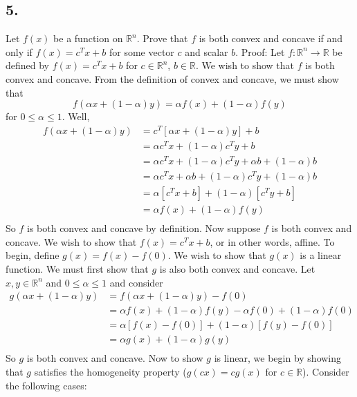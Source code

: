 \documentclass{article}
\begin{document}
\subsection*{5.} Let $f(x)$ be a function on $\mathbb{R}^n$. Prove that $f$ is both convex and concave if and only if $f(x) = c^Tx + b$ for some vector $c$ and scalar $b$.
\newline\newline
Proof: Let $f: \mathbb{R}^n \to \mathbb{R}$ be defined by $f(x) = c^Tx + b$ for $c \in \mathbb{R}^n$, $b \in \mathbb{R}$. We wish to show that $f$ is both convex and concave. From the definition of convex and concave, we must show that
\[f(\alpha x + (1 - \alpha)y) = \alpha f(x) + (1 - \alpha)f(y)\]
for $0 \leq \alpha \leq 1$. Well,
\begin{align*}
    f(\alpha x + (1 - \alpha)y) &= c^T[\alpha x + (1 - \alpha)y] + b\\
    &= \alpha c^Tx + (1 - \alpha)c^Ty + b\\
    &= \alpha c^Tx + (1 - \alpha)c^Ty + \alpha b + (1 - \alpha)b \\
    &= \alpha c^Tx + \alpha b + (1 - \alpha)c^Ty +  (1 - \alpha)b\\
    &= \alpha[c^Tx + b] + (1 - \alpha)[c^Ty + b] \\
    &= \alpha f(x) + (1 - \alpha)f(y) \\
\end{align*}
So $f$ is both convex and concave by definition. Now suppose $f$ is both convex and concave. We wish to show that $f(x) = c^Tx + b$, or in other words, affine. To begin, define $g(x) = f(x) - f(0)$. We wish to show that $g(x)$ is a linear function. We must first show that $g$ is also both convex and concave. Let $x,y \in \mathbb{R}^n$ and $0 \leq \alpha \leq 1$ and consider
\begin{align*}
    g(\alpha x + (1-\alpha)y) &= f(\alpha x + (1-\alpha)y) - f(0) \\
    &= \alpha f(x) + (1- \alpha)f(y) - \alpha f(0) + (1-\alpha)f(0) \\
    &= \alpha[f(x) - f(0)] +(1-\alpha)[f(y) - f(0)] \\
    &= \alpha g(x) + (1-\alpha)g(y) \\
\end{align*}
So $g$ is both convex and concave. Now to show $g$ is linear, we begin by showing that $g$ satisfies the homogeneity property ($g(cx) = cg(x)$ for $c \in \mathbb{R}$). Consider the following cases:
\newline\newline
\end{document}

